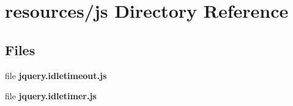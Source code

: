 \section{resources/js Directory Reference}
\label{dir_95923d429d3c0d323f016b698494341f}
\subsection*{Files}
\begin{DoxyCompactItemize}
\item 
file {\bf jquery.\+idletimeout.\+js}
\item 
file {\bf jquery.\+idletimer.\+js}
\end{DoxyCompactItemize}
